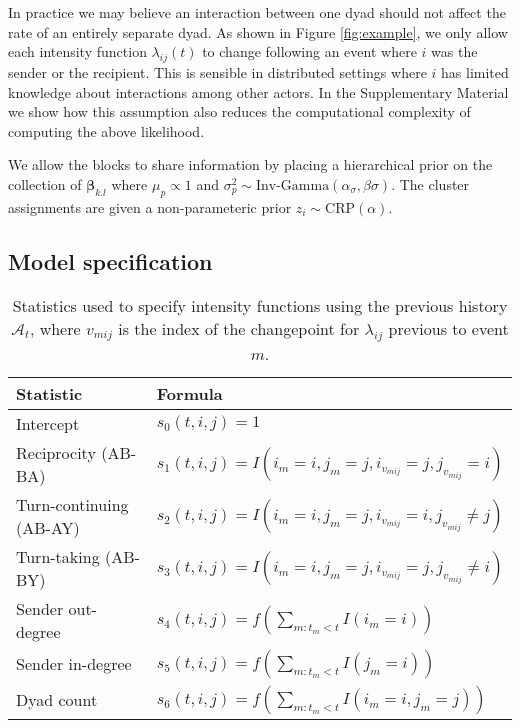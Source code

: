  In practice we may believe an interaction between one dyad should not affect the rate of an entirely separate dyad.
As shown in Figure \ref{fig:example}, we only allow each intensity function $\lambda_{ij}(t)$ to change following an event where $i$ was the sender or the recipient.
This is sensible in distributed settings where $i$ has limited knowledge about interactions among other actors.
In the Supplementary Material we show how this assumption also reduces the computational complexity of computing the above likelihood.

We allow the blocks to share information by placing a hierarchical prior on the collection of $\boldsymbol{\beta}_{k.l}$ where $\mu_p \propto 1$ and $\sigma_p^2 \sim \mbox{Inv-Gamma}(\alpha_{\sigma},\beta{\sigma})$.
The cluster assignments are given a non-parameteric prior $z_i \sim \mbox{CRP}(\alpha)$.

\subsection{Model specification}
\label{sec:specification}

\begin{table}[t]
\footnotesize
\center
\begin{tabular}{|l|l|}
\hline
Statistic & Formula\\
\hline
\hline
Intercept& $s_{0}(t,i,j) = 1$\\
Reciprocity (AB-BA)& $s_{1}(t,i,j) = I(i_m=i,j_m=j,i_{v_{mij}}=j,j_{v_{mij}}=i)$\\
Turn-continuing (AB-AY)& $s_{2}(t,i,j) =  I(i_m=i,j_m=j,i_{v_{mij}}=i,j_{v_{mij}}\ne j)$\\
Turn-taking (AB-BY)&$s_{3}(t,i,j) = I(i_m=i,j_m=j,i_{v_{mij}}=j,j_{v_{mij}}\ne i)$\\
Sender out-degree& $s_{4}(t,i,j) = f(\sum_{m:t_m<t} I(i_m=i) )$\\
Sender in-degree& $s_{5}(t,i,j) = f(\sum_{m:t_m<t} I(j_m=i) )$\\
Dyad count& $s_{6}(t,i,j) = f(\sum_{m:t_m<t} I(i_m=i,j_m=j) )$\\
\hline
\end{tabular}
\label{tab:stats}
\caption{Statistics used to specify intensity functions using the previous history $\mathcal{A}_t$, where $v_{mij}$ is the index of the changepoint for $\lambda_{ij}$ previous to event $m$.}
\end{table}




